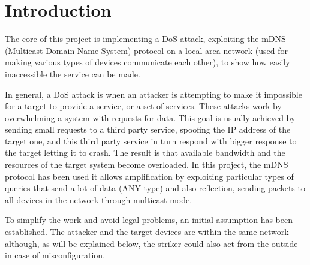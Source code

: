 \documentclass[fleqn, 11pt]{SelfArx} %
\affiliation{\textit{Department of Computer Engineering, University of Pavia, Pavia, Italy}} %
\affiliation{\textit{Enterprise Digital Infrastructure}} %
\begin{document}
\maketitle %

\tableofcontents %

\thispagestyle{empty} %


\section{Introduction} %
The core of this project is implementing a DoS attack, exploiting the mDNS (Multicast Domain Name System) protocol \cite{rfc6762} on a local area network (used for making various types of devices communicate each other), to show how easily inaccessible the service can be made. \newline

In general, a DoS attack is when an attacker is attempting to make it impossible for a target to provide a service, or a set of services. These attacks work by overwhelming a system with requests for data. \newline
This goal is usually achieved by sending small requests to a third party service, spoofing the IP address of the target one, and this third party service in turn respond with bigger response to the target letting it to crash. \newline The result is that available bandwidth and the resources of the target system become overloaded.\newline
In this project, the mDNS protocol has been used it allows amplification by exploiting particular types of queries that send a lot of data (ANY type) and also reflection, sending packets to all devices in the network through multicast mode. \newline

To simplify the work and avoid legal problems, an initial assumption has been established. The attacker and the target devices are within the same network although, as will be explained below, the striker could also act from the outside in case of misconfiguration.
\end{document}

